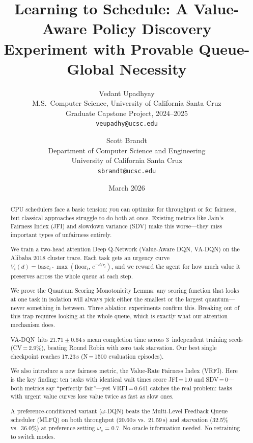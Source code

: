 \documentclass[10pt,twocolumn]{article}
\title{\textbf{Learning to Schedule: A Value-Aware Policy Discovery\\
Experiment with Provable Queue-Global Necessity}}
\author{Vedant Upadhyay\\
M.S.\ Computer Science, University of California Santa Cruz\\
Graduate Capstone Project, 2024--2025\\
\texttt{veupadhy@ucsc.edu}
\and
Scott Brandt\\
Department of Computer Science and Engineering\\
University of California Santa Cruz\\
\texttt{sbrandt@ucsc.edu}}
\date{March 2026}
\theoremstyle{remark}
\newcommand{\vrfi}{\textsc{VRFI}}
\newcommand{\vadqn}{VA-DQN}
\newcommand{\omegadqn}{$\omega$-DQN}
\begin{document}
\maketitle

\begin{abstract}

CPU schedulers face a basic tension: you can optimize for throughput
or for fairness, but classical approaches struggle to do both at
once. Existing metrics like Jain's Fairness Index (JFI) and slowdown
variance (SDV) make this worse---they miss important types of
unfairness entirely.

We train a two-head attention Deep Q-Network (Value-Aware DQN,
\vadqn) on the Alibaba 2018 cluster trace. Each task gets an urgency
curve $V_i(d) = \mathrm{base}_i \cdot \max(\mathrm{floor}_i,\,
e^{-d/\tau_i})$, and we reward the agent for how much value it
preserves across the whole queue at each step.

We prove the Quantum Scoring Monotonicity Lemma: any scoring
function that looks at one task in isolation will always pick either
the smallest or the largest quantum---never something in between.
Three ablation experiments confirm this. Breaking out of this trap
requires looking at the whole queue, which is exactly what our
attention mechanism does.

\vadqn\ hits $21.71\pm0.64$\,s mean completion time across
3~independent training seeds (CV\,=\,2.9\%), beating Round Robin
with zero task starvation. Our best single checkpoint reaches
17.23\,s (N\,=\,1500 evaluation episodes).

We also introduce a new fairness metric, the Value-Rate Fairness
Index (\vrfi). Here is the key finding: ten tasks with identical
wait times score JFI\,=\,1.0 and SDV\,=\,0---both metrics say
``perfectly fair''---yet \vrfi\,=\,0.641 catches the real problem:
tasks with urgent value curves lose value twice as fast as slow ones.

A preference-conditioned variant (\omegadqn) beats the Multi-Level
Feedback Queue scheduler (MLFQ) on both throughput (20.60\,s vs.\
21.59\,s) and starvation (32.5\% vs.\ 36.0\%) at preference setting
$\omega_s=0.7$. No oracle information needed. No retraining to
switch modes.

\end{abstract}

\end{document}
